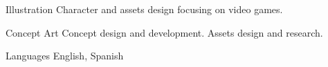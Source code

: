 

\begin{cvskills}

  \cvskill
    {Illustration} %
    {Character and assets design focusing on video games.} %

  \cvskill
    {Concept Art} %
    {Concept design and development. Assets design and research.} %

  \cvskill
    {Languages} %
    {English, Spanish} %

\end{cvskills}
